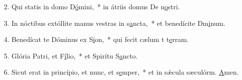 2. Qui statis in domo D\uline{ó}mini,~* in átriis domus De n\uline{o}stri.\par 
3. In nóctibus extóllite manus vestras in s\uline{a}ncta,~* et benedícite Dm\uline{i}num.\par 
4. Benedícat te Dóminus ex S\uline{i}on,~* qui fecit cælum t t\uline{e}rram.\par 
5. Glória Patri, et F\uline{í}lio,~* et Spirítu S\uline{a}ncto.\par 
6. Sicut erat in princípio, et nunc, et s\uline{e}mper,~* et in sǽcula sæculórm. \uline{A}men.\par 
